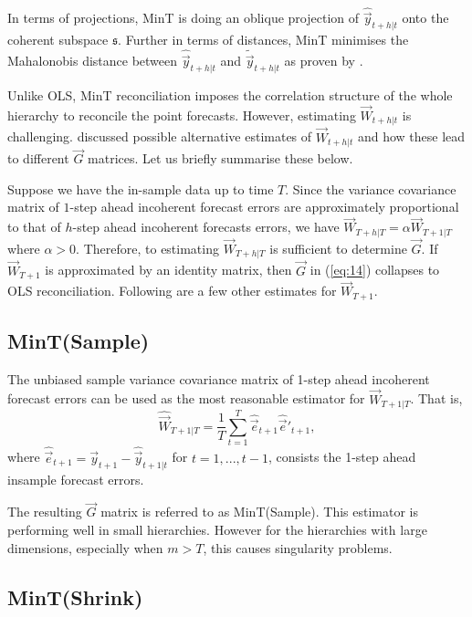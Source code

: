 \documentclass[graybox]{svmult}
\begin{document}
In terms of projections, MinT is doing an oblique projection of $\hat{\vec{y}}_{t+h|t}$ onto the coherent subspace $\mathfrak{s}$. Further in terms of distances, MinT minimises the Mahalonobis distance between $\hat{\vec{y}}_{t+h|t}$ and $\tilde{\vec{y}}_{t+h|t}$ as proven by \cite{Wickramasuriya2018}.   

Unlike OLS, MinT reconciliation imposes the correlation structure of the whole hierarchy to reconcile the point forecasts. However, estimating ${\vec{W}}_{t+h|t}$ is challenging. \citet{Wickramasuriya2018} discussed possible alternative estimates of ${\vec{W}}_{t+h|t}$ and how these lead to different $\vec{G}$ matrices. Let us briefly summarise these below.

Suppose we have the in-sample data up to time $T$. Since the variance covariance matrix of $1$-step ahead incoherent forecast errors are approximately proportional to that of $h$-step ahead incoherent forecasts errors, we have $\vec{W}_{T+h|T} = \alpha\vec{W}_{T+1|T}$ where $\alpha>0$. Therefore, to estimating ${\vec{W}}_{T+h|T}$ is sufficient to determine $\vec{G}$. If ${\vec{W}}_{T+1}$ is approximated by an identity matrix, then $\vec{G}$ in (\ref{eq:14}) collapses to OLS reconciliation. Following are a few other estimates for ${\vec{W}}_{T+1}$. 

\subsection*{MinT(Sample)}

The unbiased sample variance covariance matrix of 1-step ahead incoherent forecast errors can be used as the most reasonable estimator for ${\vec{W}}_{T+1|T}$. That is, 
\begin{equation}\label{eq:15}
\hat{\vec{W}}_{T+1|T} = \frac{1}{T}\sum_{t=1}^{T}\hat{\vec{e}}_{t+1}\hat{\vec{e}}'_{t+1},
\end{equation}
where $\hat{\vec{e}}_{t+1} = \vec{y}_{t+1}-\hat{\vec{y}}_{t+1|t}$ for $t=1,...,t-1$,  consists the 1-step ahead insample forecast errors. 


The resulting $\vec{G}$ matrix is referred to as MinT(Sample). This estimator is performing well in small hierarchies. However for the hierarchies with large dimensions, especially when $m>T$, this causes singularity problems. 

\subsection*{MinT(Shrink)}
\end{document}
